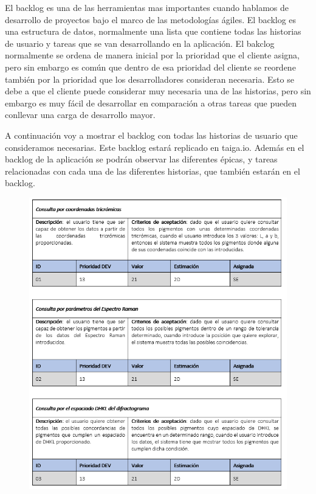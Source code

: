 El backlog es una de las herramientas mas importantes cuando hablamos de desarrollo de proyectos bajo el marco de las metodologías ágiles. El backlog es una estructura de datos, normalmente una lista que contiene todas las historias de usuario y tareas que se van desarrollando en la aplicación. El bakclog normalmente se ordena de manera inicial por la prioridad que el cliente asigna, pero sin embargo es común que dentro de esa prioridad del cliente se reordene también por la prioridad que los desarrolladores consideran necesaria. Esto se debe a que el cliente puede considerar muy necesaria una de las historias, pero sin embargo es muy fácil de desarrollar en comparación a otras tareas que pueden conllevar una carga de desarrollo mayor. 

A continuación voy a mostrar el backlog con todas las historias de usuario que consideramos necesarias. Este backlog estará replicado en taiga.io. Además en el backlog de la aplicación se podrán observar las diferentes épicas, y tareas relacionadas con cada una de las diferentes historias, que también estarán en el backlog. 

\begin{figure}[H]
    \centering
    \includegraphics[scale=0.8]{imagenes/diseno/us13.png}
    \label{fig:us13}
\end{figure}

